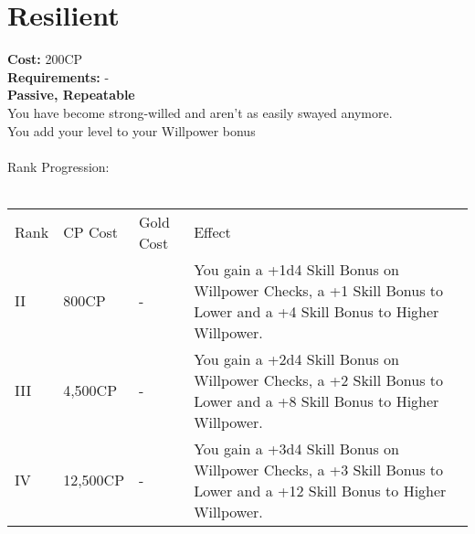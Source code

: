 \section{Resilient}\label{perk:resilient}
\textbf{Cost:} 200CP\\
\textbf{Requirements:} -\\
\textbf{Passive, Repeatable}\\
You have become strong-willed and aren't as easily swayed anymore.\\
You add your level to your Willpower bonus\\
\\
Rank Progression:\\
\\
\begin{longtable}{l | l | l | p{9cm}}
	Rank & CP Cost & Gold Cost & Effect\\
	II & 800CP & - & You gain a +1d4 Skill Bonus on Willpower Checks, a +1 Skill Bonus to Lower and a +4 Skill Bonus to Higher Willpower.\\
	III & 4,500CP & - & You gain a +2d4 Skill Bonus on Willpower Checks, a +2 Skill Bonus to Lower and a +8 Skill Bonus to Higher Willpower.\\
	IV & 12,500CP & - & You gain a +3d4 Skill Bonus on Willpower Checks, a +3 Skill Bonus to Lower and a +12 Skill Bonus to Higher Willpower.\\
\end{longtable}
